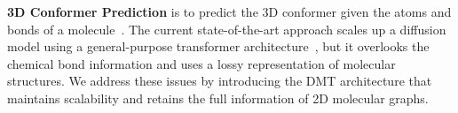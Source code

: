 

\textbf{3D Conformer Prediction} is to predict the 3D conformer given the atoms and bonds of a molecule~\citep{GeoDiff,GeoMol,UniMol,torsion,ParticleGuidance}. The current state-of-the-art approach scales up a diffusion model using a general-purpose transformer architecture~\citep{MCF}, but it overlooks the chemical bond information and uses a lossy representation of molecular structures. We address these issues by introducing the DMT architecture that maintains scalability and retains the full information of 2D molecular graphs. 

